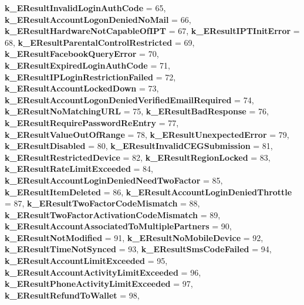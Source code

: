 \begin{DoxyCompactItemize}
{\bfseries k\+\_\+\+E\+Result\+Invalid\+Login\+Auth\+Code} = 65, 
\newline
{\bfseries k\+\_\+\+E\+Result\+Account\+Logon\+Denied\+No\+Mail} = 66, 
{\bfseries k\+\_\+\+E\+Result\+Hardware\+Not\+Capable\+Of\+I\+PT} = 67, 
{\bfseries k\+\_\+\+E\+Result\+I\+P\+T\+Init\+Error} = 68, 
{\bfseries k\+\_\+\+E\+Result\+Parental\+Control\+Restricted} = 69, 
\newline
{\bfseries k\+\_\+\+E\+Result\+Facebook\+Query\+Error} = 70, 
{\bfseries k\+\_\+\+E\+Result\+Expired\+Login\+Auth\+Code} = 71, 
{\bfseries k\+\_\+\+E\+Result\+I\+P\+Login\+Restriction\+Failed} = 72, 
{\bfseries k\+\_\+\+E\+Result\+Account\+Locked\+Down} = 73, 
\newline
{\bfseries k\+\_\+\+E\+Result\+Account\+Logon\+Denied\+Verified\+Email\+Required} = 74, 
{\bfseries k\+\_\+\+E\+Result\+No\+Matching\+U\+RL} = 75, 
{\bfseries k\+\_\+\+E\+Result\+Bad\+Response} = 76, 
{\bfseries k\+\_\+\+E\+Result\+Require\+Password\+Re\+Entry} = 77, 
\newline
{\bfseries k\+\_\+\+E\+Result\+Value\+Out\+Of\+Range} = 78, 
{\bfseries k\+\_\+\+E\+Result\+Unexpected\+Error} = 79, 
{\bfseries k\+\_\+\+E\+Result\+Disabled} = 80, 
{\bfseries k\+\_\+\+E\+Result\+Invalid\+C\+E\+G\+Submission} = 81, 
\newline
{\bfseries k\+\_\+\+E\+Result\+Restricted\+Device} = 82, 
{\bfseries k\+\_\+\+E\+Result\+Region\+Locked} = 83, 
{\bfseries k\+\_\+\+E\+Result\+Rate\+Limit\+Exceeded} = 84, 
{\bfseries k\+\_\+\+E\+Result\+Account\+Login\+Denied\+Need\+Two\+Factor} = 85, 
\newline
{\bfseries k\+\_\+\+E\+Result\+Item\+Deleted} = 86, 
{\bfseries k\+\_\+\+E\+Result\+Account\+Login\+Denied\+Throttle} = 87, 
{\bfseries k\+\_\+\+E\+Result\+Two\+Factor\+Code\+Mismatch} = 88, 
{\bfseries k\+\_\+\+E\+Result\+Two\+Factor\+Activation\+Code\+Mismatch} = 89, 
\newline
{\bfseries k\+\_\+\+E\+Result\+Account\+Associated\+To\+Multiple\+Partners} = 90, 
{\bfseries k\+\_\+\+E\+Result\+Not\+Modified} = 91, 
{\bfseries k\+\_\+\+E\+Result\+No\+Mobile\+Device} = 92, 
{\bfseries k\+\_\+\+E\+Result\+Time\+Not\+Synced} = 93, 
\newline
{\bfseries k\+\_\+\+E\+Result\+Sms\+Code\+Failed} = 94, 
{\bfseries k\+\_\+\+E\+Result\+Account\+Limit\+Exceeded} = 95, 
{\bfseries k\+\_\+\+E\+Result\+Account\+Activity\+Limit\+Exceeded} = 96, 
{\bfseries k\+\_\+\+E\+Result\+Phone\+Activity\+Limit\+Exceeded} = 97, 
\newline
{\bfseries k\+\_\+\+E\+Result\+Refund\+To\+Wallet} = 98, 

\end{DoxyCompactItemize}
